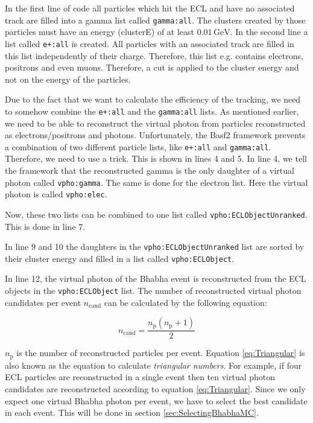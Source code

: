 \documentclass[a4paper,11pt,twosided,final,german,openbib,pdftex,listof=totoc,bibliography=totoc]{scrbook}
\begin{document}
In the first line of code all particles which hit the ECL and have no associated track are filled into a gamma list called \texttt{gamma:all}. The clusters created by those particles must have an energy (clusterE) of at least $0.01\,\textrm{GeV}$. In the second line a list called \texttt{e+:all} is created. All particles with an associated track are filled in this list independently of their charge. Therefore, this list e.g. contains electrons, positrons and even muons. Therefore, a cut is applied to the cluster energy and not on the energy of the particles.


Due to the fact that we want to calculate the efficiency of the tracking, we need to somehow combine the \texttt{e+:all} and the \texttt{gamma:all} lists. As mentioned earlier, we need to be able to reconstruct the virtual photon from particles reconstructed as electrons/positrons and photons.
Unfortunately, the Basf2 framework prevents a combination of two different particle lists, like \texttt{e+:all} and \texttt{gamma:all}. Therefore, we need to use a trick. This is shown in lines 4 and 5. In line 4, we tell the framework that the reconstructed gamma is the only daughter of a virtual photon called \texttt{vpho:gamma}. The same is done for the electron list. Here the virtual photon is called \texttt{vpho:elec}. 

Now, these two lists can be combined to one list called \texttt{vpho:ECLObjectUnranked}. This is done in line 7.

In line 9 and 10 the daughters in the \texttt{vpho:ECLObjectUnranked} list are sorted by their cluster energy and filled in a list called \texttt{vpho:ECLObject}.

In line 12, the virtual photon of the Bhabha event is reconstructed from the ECL objects in the \texttt{vpho:ECLObject} list. The number of reconstructed virtual photon candidates per event $n_{\textrm{cand}}$ can be calculated by the following equation\cite{triangular}:

\begin{equation}
n_{\textrm{cand}} = \frac{n_{\textrm{p}}(n_{\textrm{p}} +1)}{2}
\label{eq:Triangular}
\end{equation}

$n_{\textrm{p}}$ is the number of reconstructed particles per event. Equation \ref{eq:Triangular} is also known as the equation to calculate \textit{triangular numbers}. For example, if four ECL particles are reconstructed in a single event then ten virtual photon candidates are reconstructed according to equation \ref{eq:Triangular}. Since we only expect one virtual Bhabha photon per event, we have to select the best candidate in each event. This will be done in section \ref{sec:SelectingBhabhaMC}.
\end{document}
